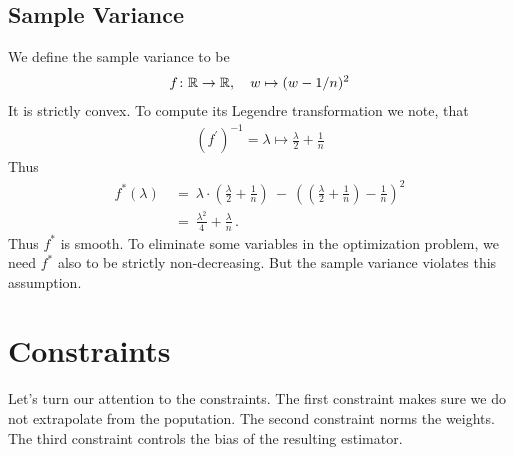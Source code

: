   \subsection*{Sample Variance}
We define the sample variance to be
\begin{gather}
  f
  \colon
  \mathbb{R}
  \to
  \mathbb{R}
  ,\quad
  w
  \mapsto
  (w-1/n)^2
\end{gather}
It is strictly convex. To compute its Legendre transformation we note, that
\begin{gather}
  (f^{'})^{-1}
  =
  \lambda\mapsto
  \frac{\lambda}{2}
  +
  \frac{1}{n}
\end{gather}
Thus
  \begin{align*}
  f^*
  (\lambda)
  &
  \ 
  =
  \ 
  \lambda
    \cdot
    \left( 
  \frac{\lambda}{2}
  +
  \frac{1}{n}
    \right)
  \ 
    -
  \ 
    \left( 
    \left( 
  \frac{\lambda}{2}
  +
  \frac{1}{n}
    \right)
    -
    \frac{1}{n}
    \right)
    ^2
    \\
  &
  \ 
  =
  \ 
  \frac{\lambda^2}{4}
  +
  \frac{\lambda}{n}
  \,.
  \end{align*}
  Thus $f^*$ is smooth.
  To eliminate some variables in the optimization problem,
  we need $f^*$ also to be
  strictly non-decreasing. But the sample variance violates this assumption.

\section*{Constraints}
Let's turn our attention to the constraints.
The first constraint makes sure we do not extrapolate from the poputation.
The second constraint norms the weights. 
The third constraint controls the bias of the resulting estimator.
